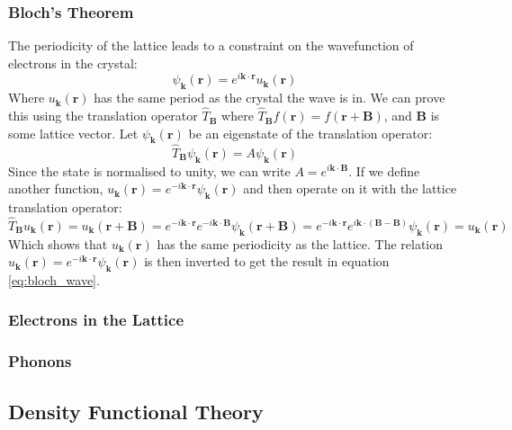 \documentclass[12pt]{article}
\begin{document}
\subsubsection{Bloch's Theorem}
The periodicity of the lattice leads to a constraint on the wavefunction of electrons in the crystal:
\begin{equation}\label{eq:bloch_wave}
	\psi_\mathbf k(\mathbf r) = e^{i\mathbf{k}\cdot \mathbf{r}}u_\mathbf k(\mathbf r)
\end{equation}
Where $u_\mathbf k(\mathbf r)$ has the same period as the crystal the wave is in.
We can prove this using the translation operator $\hat T_\mathbf B$ where $\hat T_\mathbf B f(\mathbf r) = f(\mathbf r + \mathbf B)$, and $\mathbf B$ is some lattice vector. Let $\psi_\mathbf k(\mathbf r)$ be an eigenstate of the translation operator:
\begin{equation}
	\hat T_\mathbf B \psi_\mathbf k(\mathbf r) = A \psi_\mathbf k(\mathbf r)
\end{equation}
Since the state is normalised to unity, we can write $A=e^{i\mathbf k \cdot \mathbf B}$. If we define another function, $u_\mathbf k(\mathbf r) = e^{-i\mathbf k \cdot \mathbf r}\psi_\mathbf k(\mathbf r)$ and then operate on it with the lattice translation operator:
\begin{equation}\label{eq:bloch_proof}
\hat T_\mathbf B u_\mathbf k(\mathbf r) = u_\mathbf k(\mathbf r + \mathbf B) = 
e^{-i\mathbf k \cdot \mathbf r}e^{-i\mathbf k \cdot \mathbf B} \psi_\mathbf k(\mathbf r + \mathbf B) = 
e^{-i\mathbf k \cdot \mathbf r}e^{i\mathbf k \cdot (\mathbf B - \mathbf B)} \psi_\mathbf k(\mathbf r) = u_\mathbf k(\mathbf r)
\end{equation}
Which shows that $u_\mathbf k(\mathbf r)$ has the same periodicity as the lattice. The relation $u_\mathbf k(\mathbf r) = e^{-i \mathbf k \cdot \mathbf r}\psi_\mathbf k(\mathbf r)$ is then inverted to get the result in equation \ref{eq:bloch_wave}.
\subsubsection{Electrons in the Lattice}
\subsubsection{Phonons}
\subsection{Density Functional Theory}
\end{document}
